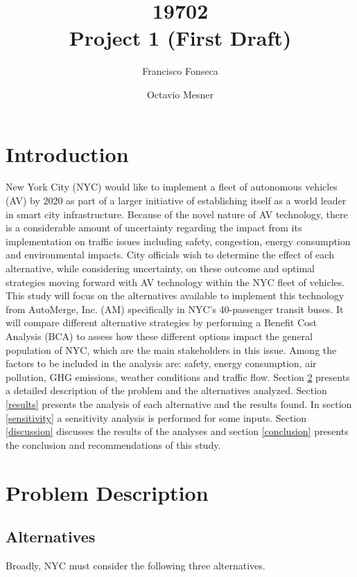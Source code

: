 \documentclass[11pt, letterpaper]{article}
\title{\vspace{-2cm} 19702 \\ Project 1 (First Draft)}
\author{Francisco Fonseca \and Octavio Mesner}
\date{\mydate}
\date{\mydateformat\normalsize\mydate} %
\begin{document}
\maketitle %

\section{Introduction} \label{intro}

New York City (NYC) would like to implement a fleet of autonomous
vehicles (AV) by 2020 as part of a larger initiative of establishing
itself as a world leader in smart city infrastructure. Because of the
novel nature of AV technology, there is a considerable amount of
uncertainty regarding the impact from its implementation on traffic
issues including
safety, congestion, energy consumption and environmental impacts.
City officials wish to determine the effect of each alternative, while
considering uncertainty, on these outcome
and optimal strategies moving forward with AV
technology within the NYC fleet of vehicles. This study will focus on
the alternatives available to implement  this technology
from AutoMerge, Inc. (AM) specifically in NYC's 40-passenger transit
buses. It will compare different alternative strategies by performing
a Benefit Cost Analysis (BCA) to assess how these different options
impact the general population of NYC, which are the main stakeholders
in this issue. Among the factors to be included in the analysis are:
safety, energy consumption, air pollution, GHG emissions, weather
conditions and traffic flow. Section \ref{problem} presents a detailed
description of the problem and the alternatives analyzed. Section
\ref{results} presents the analysis of each alternative and the
results found. In section \ref{sensitivity} a sensitivity analysis is
performed for some inputs. Section \ref{discussion} discusses the
results of the analyses and section \ref{conclusion} presents the
conclusion and recommendations of this study.

\section{Problem Description} \label{problem}
\subsection{Alternatives}

Broadly, NYC must consider the following three alternatives.
\end{document}
